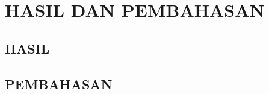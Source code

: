 \chapter{HASIL DAN PEMBAHASAN}
\label{chap:hasildanpembahasan}

\paragraphtextstyle

\section{HASIL}
\label{sec:hasil}

\section{PEMBAHASAN}
\label{sec:pembahasan}
